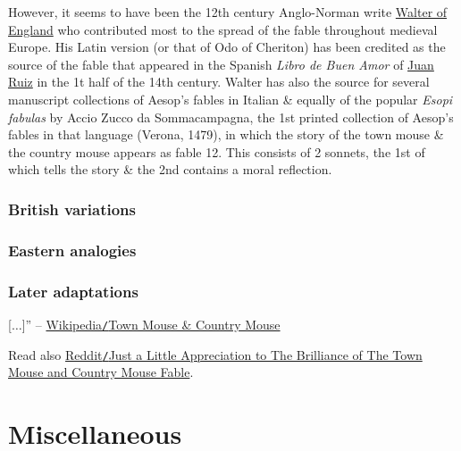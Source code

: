 \documentclass{article}
\begin{document}
However, it seems to have been the 12th century Anglo-Norman write \href{https://en.wikipedia.org/wiki/Walter_of_England}{Walter of England} who contributed most to the spread of the fable throughout medieval Europe. His Latin version (or that of Odo of Cheriton) has been credited as the source of the fable that appeared in the Spanish {\it Libro de Buen Amor} of \href{https://en.wikipedia.org/wiki/Juan_Ruiz}{\sc Juan Ruiz} in the 1t half of the 14th century. Walter has also the source for several manuscript collections of Aesop's fables in Italian \& equally of the popular {\it Esopi fabulas} by Accio Zucco da Sommacampagna, the 1st printed collection of Aesop's fables in that language (Verona, 1479), in which the story of the town mouse \& the country mouse appears as fable 12. This consists of 2 sonnets, the 1st of which tells the story \& the 2nd contains a moral reflection.

\subsubsection{British variations}

\subsubsection{Eastern analogies}

\subsubsection{Later adaptations}
[$\ldots$]'' -- \href{https://en.wikipedia.org/wiki/The_Town_Mouse_and_the_Country_Mouse}{Wikipedia{\tt/}Town Mouse \& Country Mouse}

Read also \href{https://www.reddit.com/r/ChainsawMan/comments/ghj22b/just_a_little_appreciation_to_the_brilliance_of/}{Reddit{\tt/}Just a Little Appreciation to The Brilliance of The Town Mouse and Country Mouse Fable}.


\section{Miscellaneous}


\printbibliography[heading=bibintoc]
	
\end{document}
